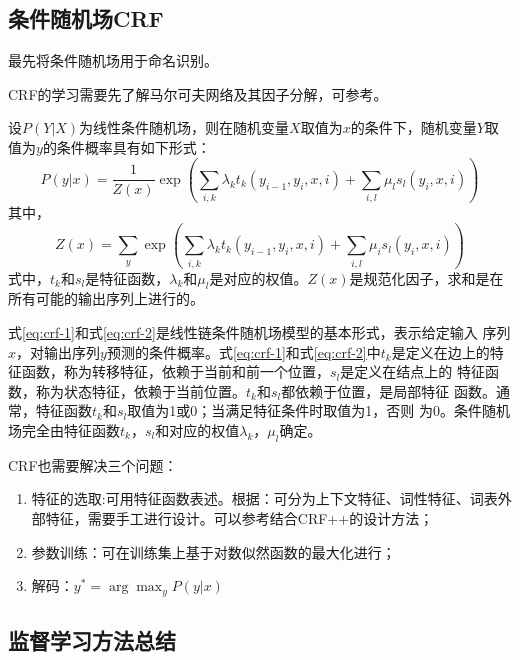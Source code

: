 \documentclass[a4paper,UTF8,no-math]{ctexart}
\begin{document}
	\subsection{条件随机场CRF}
	
	\citep{lafferty2001conditional}最先将条件随机场用于命名识别。
	
	CRF的学习需要先了解马尔可夫网络及其因子分解，可参考\citep{李航2012统计学习方法}。
	
	设$P(Y|X)$为线性条件随机场，则在随机变量$X$取值为$x$的条件下，随机变量$Y$取值为$y$的条件概率具有如下形式：\begin{equation}
P(y | x)=\frac{1}{Z(x)} \exp \left(\sum_{i, k} \lambda_{k} t_{k}\left(y_{i-1},y_{i}, x, i\right)+\sum_{i, l} \mu_{l} s_{l}\left(y_{i}, x, i\right)\right)
\label{eq:crf-1}
	\end{equation}
	其中，\begin{equation}
Z(x)=\sum_{y} \exp \left(\sum_{i, k} \lambda_{k} t_{k}\left(y_{i-1}, y_{i}, x, i\right)+\sum_{i, l} \mu_{i} s_{l}\left(y_{i}, x, i\right)\right)
\label{eq:crf-2}
	\end{equation}
	式中，$t_{k}$和$s_{l}$是特征函数，$\lambda_{k}$和$\mu_{l}$是对应的权值。$Z(x)$是规范化因子，求和是在所有可能的输出序列上进行的。
	
	式\eqref{eq:crf-1}和式\eqref{eq:crf-2}是线性链条件随机场模型的基本形式，表示给定输入
序列$x$，对输出序列$y$预测的条件概率。式\eqref{eq:crf-1}和式\eqref{eq:crf-2}中$t_{k}$是定义在边上的特征函数，称为转移特征，依赖于当前和前一个位置，$s_{l}$是定义在结点上的
特征函数，称为状态特征，依赖于当前位置。$t_{k}$和$s_{l}$都依赖于位置，是局部特征
函数。通常，特征函数$t_{k}$和$s_{l}$取值为1或0；当满足特征条件时取值为1，否则
为0。条件随机场完全由特征函数$t_{k}$，$s_{l}$和对应的权值$\lambda_{k}$，$\mu_{l}$确定。

	CRF也需要解决三个问题：
	\begin{enumerate}
		\item 特征的选取:可用特征函数表述。根据\citep{_crf_2010}：可分为上下文特征、词性特征、词表外部特征，需要手工进行设计。可以参考\citep{noauthor_crf_nodate}结合CRF++的设计方法；
		\item 参数训练：可在训练集上基于对数似然函数的最大化进行；
		\item 解码：$y^{*} = \arg \max_{y} P(y|x)$
	\end{enumerate}
	
	\subsection{监督学习方法总结}
	
\end{document}
